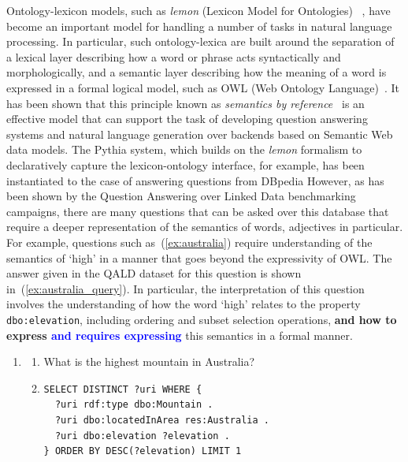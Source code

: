 \documentclass[11pt]{article}
\begin{document}
Ontology-lexicon models, such as \emph{lemon} (Lexicon Model for Ontologies)~
\cite{mccrae2012inter}, have become an important model for handling a 
number of tasks in natural language processing. In particular, such 
ontology-lexica are built around the separation of a lexical layer describing 
how a word or phrase acts syntactically and morphologically, and a semantic layer 
describing how the meaning of a word is expressed in a formal logical model, 
such as OWL (Web Ontology Language)~\cite{mcguinness2004owl}. It has been 
shown that this principle known as \emph{semantics by reference}~
\cite{buitelaar2010ontology} is an effective model that can support the task of developing
question answering systems \cite{unger2011pythia} and natural language 
generation \cite{cimiano2013exploiting} over backends based on Semantic Web data models.
The Pythia system, which builds on the \emph{lemon} formalism to declaratively capture the lexicon-ontology interface, for example, has been instantiated to the case of answering questions from DBpedia \cite{unger2011pythia}
However, as has been 
shown by the Question Answering over Linked Data \cite[QALD]{lopez2013evaluating}
benchmarking campaigns, there are many questions that can be asked over this database that require 
a deeper representation of the semantics of words, adjectives in particular. For example, 
questions such as~(\ref{ex:australia}) require understanding of the semantics of `high' in a manner that goes beyond the expressivity of OWL. The answer given 
in the QALD dataset for this question is shown in~(\ref{ex:australia_query}). 
In particular, the interpretation of this question involves the understanding of 
how the word `high' relates to the property {\tt dbo:elevation}, including ordering 
and subset selection operations, \textbf{and how to express \textcolor{blue}{and requires expressing}} this semantics in a formal manner.

\begin{enumerate}
\item \begin{enumerate} 
\item What is the highest mountain in Australia? \label{ex:australia}
\item \begin{small}\begin{small}\begin{verbatim}
SELECT DISTINCT ?uri WHERE { 
  ?uri rdf:type dbo:Mountain . 
  ?uri dbo:locatedInArea res:Australia . 
  ?uri dbo:elevation ?elevation . 
} ORDER BY DESC(?elevation) LIMIT 1
\end{verbatim}\end{small} \end{small}
\label{ex:australia_query}
\end{enumerate}
\end{enumerate}
\end{document}
